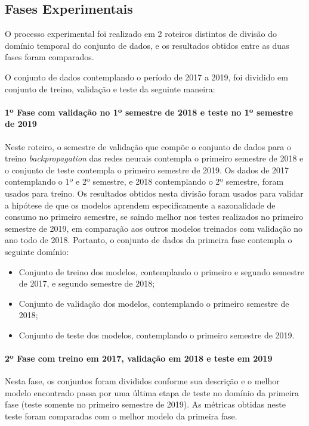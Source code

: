     	\subsection{Fases Experimentais} \label{subsec:fases_experimentais}
            O processo experimental foi realizado em 2 roteiros distintos de divisão do domínio temporal do conjunto de dados, e os resultados obtidos entre as duas fases foram comparados.
            
            O conjunto de dados contemplando o período de 2017 a 2019, foi dividido em conjunto de treino, validação e teste da seguinte maneira: 
            
            \paragraph{1º Fase com validação no 1º semestre de 2018 e teste no 1º semestre de 2019}
                Neste roteiro, o semestre de validação que compõe o conjunto de dados para o treino \textit{backpropagation} das redes neurais contempla o primeiro semestre de 2018 e o conjunto de teste contempla o primeiro semestre de 2019.
                Os dados de 2017 contemplando o 1º e 2º semestre, e 2018 contemplando o 2º semestre, foram usados para treino. Os resultados obtidos nesta divisão foram usados para validar a hipótese de que os modelos aprendem especificamente a sazonalidade de consumo no primeiro semestre, se saindo melhor nos testes realizados no primeiro semestre de 2019, em comparação aos outros modelos treinados com validação no ano todo de 2018.
                Portanto, o conjunto de dados da primeira fase contempla o seguinte domínio:
            \begin{itemize}
                    \item Conjunto de treino dos modelos, contemplando o primeiro e segundo semestre de 2017, e segundo semestre de 2018;
                    \item Conjunto de validação dos modelos, contemplando o primeiro semestre de 2018;
                    \item Conjunto de teste dos modelos, contemplando o primeiro semestre de 2019.             
            \end{itemize}
            
            \paragraph{2º Fase com treino em 2017, validação em 2018 e teste em 2019}
                Nesta fase, os conjuntos foram divididos conforme sua descrição e o melhor modelo encontrado passa por uma última etapa de teste no domínio da primeira fase (teste somente no primeiro semestre de 2019).
                As métricas obtidas neste teste foram comparadas com o melhor modelo da primeira fase.
    
